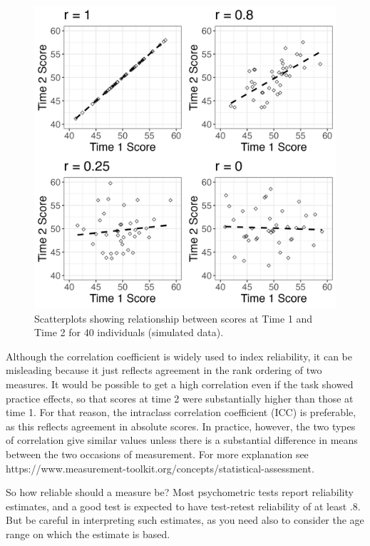 \documentclass{krantz}
\begin{document}
\begin{figure}
\includegraphics[width=0.8\linewidth]{images_bw/correlationfig} \caption{Scatterplots showing relationship between scores at Time 1 and Time 2 for 40 individuals (simulated data).}\label{fig:correlationfig}
\end{figure}

\begin{tcolorbox}[colback=Black!5!lightgray,colframe=black!75!black,coltitle=white,title=Correlation as an index of reliability]\label{box:correlation}

Although the correlation coefficient is widely used to index reliability, it can be misleading because it just reflects agreement in the rank ordering of two measures. It would be possible to get a high correlation even if the task showed practice effects, so that scores at time 2 were substantially higher than those at time 1. For that reason, the intraclass correlation coefficient (ICC) is preferable, as this reflects agreement in absolute scores. In practice, however, the two types of correlation give similar values unless there is a substantial difference in means between the two occasions of measurement. For more explanation see  https://www.measurement-toolkit.org/concepts/statistical-assessment.
\end{tcolorbox}

 
So how reliable should a measure be? Most psychometric tests report reliability estimates, and a good test is expected to have test-retest reliability of at least .8. But be careful in interpreting such estimates, as you need also to consider the age range on which the estimate is based.
\end{document}

